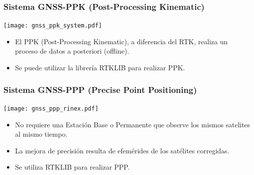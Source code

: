 \begin{frame}
    \frametitle{Sistema GNSS-PPK (Post-Processing Kinematic)}
    \begin{center}
        \texttt{[image: gnss\_ppk\_system.pdf]}
    \end{center}

    \begin{itemize}
        \item El PPK (Post-Processing Kinematic), a diferencia del RTK, realiza un proceso de datos a posteriori (offline).
        

        \item Se puede utilizar la librería RTKLIB para realizar PPK.
    \end{itemize}
    
\end{frame}

\begin{frame}
    \frametitle{Sistema GNSS-PPP (Precise Point Positioning)}
    \begin{center}
        \texttt{[image: gnss\_ppp\_rinex.pdf]}
    \end{center}

    \begin{itemize}
        \item No requiere una Estación Base o Permanente que observe los mismos satelites al mismo tiempo.
        \item La mejora de precisión resulta de efemérides de los satélites corregidas.
        \item Se utiliza RTKLIB para realizar PPP.
    \end{itemize}

\end{frame}